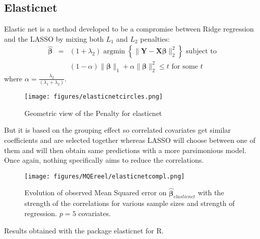 \documentclass[12pt,a4paper]{report}
\begin{document}
 	 
	 
		\subsection{Elasticnet}		%

			Elastic net \cite{zou2005regularization} is a method developed to be a compromise between Ridge regression and the \textsc{LASSO} by mixing both $L_1$ and $L_2$ penalties: 
	\begin{eqnarray}
		\boldsymbol{\hat{\beta}}&=&(1+\lambda_2) \operatorname{argmin}\left\lbrace \parallel \boldsymbol{Y}-\boldsymbol{X\beta} \parallel_2^2 \right\rbrace \textrm{ subject to} \nonumber \\
			 & &(1-\alpha)\parallel\boldsymbol{\beta}\parallel_1+\alpha\parallel\boldsymbol{\beta}\parallel_2^2\leq t \textrm{ for some } t
	\end{eqnarray}
	where $\alpha=\frac{\lambda_2}{(\lambda_1+\lambda_2)}$. 
	
	
	\begin{figure}[h!]
			\centering
			\texttt{[image: figures/elasticnetcircles.png]} 
			\caption{Geometric view of the Penalty for elasticnet}
		\end{figure}	
	
	But it is based on the grouping effect so correlated covariates get similar coefficients and are selected together whereas LASSO will choose between one of them and will then obtain same predictions with a more parsimonious model. Once again, nothing specifically aims to reduce the correlations. 
	
	 \begin{figure}
	 \centering
	  \texttt{[image: figures/MQEreel/elasticnetcompl.png]}
	  \caption{Evolution of observed Mean Squared error on $\hat{\boldsymbol{\beta}}_{elasticnet}$ with the strength of the correlations for various sample sizes and strength of regression. $p=5$ covariates. } \label{MQEelasticnetcompl}
	\end{figure}
	Results obtained with the package elasticnet for R.
		
\end{document}
